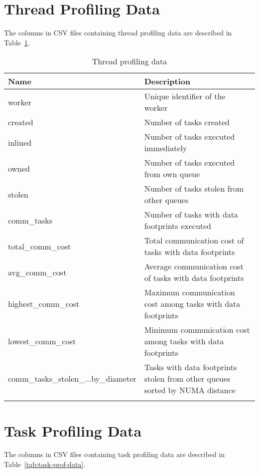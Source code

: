 \documentclass[11pt,a4paper]{article}
\begin{document}
\begin{appendices}
\section{Thread Profiling Data}
The columns in CSV files containing thread profiling data are described in Table~\ref{tab:thread-prof-data}.

    \begin{longtable}{|p{4cm}|p{7cm}|}
    \hline
    \textbf{Name} & \textbf{Description} \\ \hline
    worker & Unique identifier of the worker \\ \hline
    created & Number of tasks created \\ \hline
    inlined & Number of tasks executed immediately \\ \hline
    owned & Number of tasks executed from own queue \\ \hline
    stolen & Number of tasks stolen from other queues \\ \hline
    comm\_tasks & Number of tasks with data footprints executed \\ \hline
    total\_comm\_cost & Total communication cost of tasks with data footprints \\ \hline
    avg\_comm\_cost & Average communication cost of tasks with data footprints \\ \hline
    highest\_comm\_cost & Maximum communication cost among tasks with data footprints \\ \hline
    lowest\_comm\_cost & Minimum communication cost among tasks with data footprints \\ \hline
    comm\_tasks\_stolen\_\newline...by\_diameter & Tasks with data footprints stolen from other queues sorted by NUMA distance \\ \hline
    \caption{Thread profiling data}
    \label{tab:thread-prof-data}
\end{longtable}

\section{Task Profiling Data}
The columns in CSV files containing task profiling data are described in Table~\ref{tab:task-prof-data}.


\end{appendices}
\end{document}
